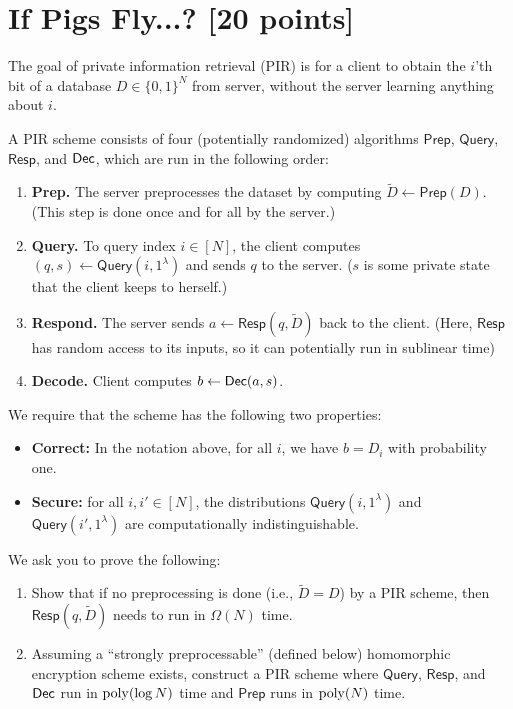 \documentclass[11pt]{article}
\newcommand{\zo}{\{0,1\}}
\def\Prep{\mathsf{Prep}}
\def\Resp{\mathsf{Resp}}
\def\Query{\mathsf{Query}}
\def\Resp{\mathsf{Resp}}
\begin{document}
\section{If Pigs Fly...? [20 points]}
The goal of private information retrieval (PIR) is for a client to obtain the $i$'th bit of a database $D \in \zo^N$ from server, without the server learning anything about $i$. 
\begin{definition}
    A PIR scheme consists of four (potentially randomized) algorithms $\Prep$, $\Query$, $\Resp$, and $\mathsf{Dec}$, which are run in the following order:
\begin{enumerate}
    \item \textbf{Prep.} The server preprocesses the dataset by computing $\tilde{D} \gets \Prep(D)$. (This step is done once and for all by the server.)
    \item \textbf{Query.} To query index $i \in [N]$, the client computes $(q, s) \gets \Query(i, 1^\lambda)$ and sends $q$ to the server. ($s$ is some private state that the client keeps to herself.)
    \item \textbf{Respond.} The server sends $a \gets \Resp(q, \tilde{D})$ back to the client. (Here, $\Resp$ has random access to its inputs, so it can potentially run in sublinear time)
    \item \textbf{Decode.} Client computes $b  \leftarrow \mathsf{Dec}(a, s)$.
\end{enumerate}
We require that the scheme has the following two properties: \begin{itemize}
    \item  \textbf{Correct:} In the notation above, for all $i$, we have $b = D_i$ with probability one. 
    \item \textbf{Secure:} for all $i, i' \in [N]$, the distributions $\Query(i, 1^\lambda)$ and $\Query(i', 1^\lambda)$ are computationally indistinguishable. 
\end{itemize}
\end{definition}

\noindent
We ask you to prove the following:
\begin{enumerate}
    \item Show that if no preprocessing is done (i.e., $\tilde{D} = D$) by a PIR scheme, then $\Resp(q, \tilde{D})$ needs to run in $\Omega(N)$ time. 
    \item Assuming a ``strongly preprocessable'' (defined below) homomorphic encryption scheme exists, construct a PIR scheme where $\Query$, $\Resp$, and $\mathsf{Dec}$ run in ${\rm poly} (\log N)$ time and $\Prep$ runs in ${\rm poly}(N)$ time.
\end{enumerate}
\end{document}

